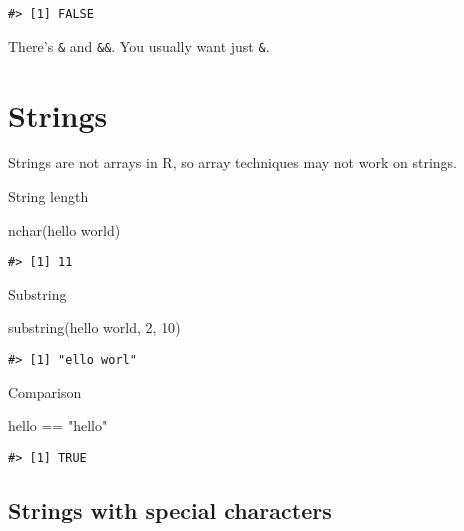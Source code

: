 \documentclass[
]{book}
\newenvironment{Shaded}{\begin{snugshade}}{\end{snugshade}}
\newcommand{\DecValTok}[1]{\textcolor[rgb]{0.00,0.00,0.81}{#1}}
\newcommand{\FunctionTok}[1]{\textcolor[rgb]{0.00,0.00,0.00}{#1}}
\newcommand{\NormalTok}[1]{#1}
\newcommand{\SpecialCharTok}[1]{\textcolor[rgb]{0.00,0.00,0.00}{#1}}
\newcommand{\StringTok}[1]{\textcolor[rgb]{0.31,0.60,0.02}{#1}}
\begin{document}
\begin{verbatim}
#> [1] FALSE
\end{verbatim}

There's \texttt{\&} and \texttt{\&\&}. You usually want just \texttt{\&}.

\hypertarget{strings}{%
\section{Strings}\label{strings}}

Strings are not arrays in R, so array techniques may not work on strings.

String length

\begin{Shaded}
\begin{Highlighting}[]
\FunctionTok{nchar}\NormalTok{(}\StringTok{\textquotesingle{}hello world\textquotesingle{}}\NormalTok{)}
\end{Highlighting}
\end{Shaded}

\begin{verbatim}
#> [1] 11
\end{verbatim}

Substring

\begin{Shaded}
\begin{Highlighting}[]
\FunctionTok{substring}\NormalTok{(}\StringTok{\textquotesingle{}hello world\textquotesingle{}}\NormalTok{, }\DecValTok{2}\NormalTok{, }\DecValTok{10}\NormalTok{)}
\end{Highlighting}
\end{Shaded}

\begin{verbatim}
#> [1] "ello worl"
\end{verbatim}

Comparison

\begin{Shaded}
\begin{Highlighting}[]
\StringTok{\textquotesingle{}hello\textquotesingle{}} \SpecialCharTok{==} \StringTok{"hello"}
\end{Highlighting}
\end{Shaded}

\begin{verbatim}
#> [1] TRUE
\end{verbatim}

\hypertarget{strings-with-special-characters}{%
\subsection{Strings with special characters}\label{strings-with-special-characters}}
\end{document}
